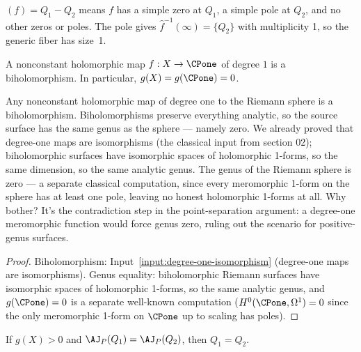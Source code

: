 \begin{proofsketch}
\((f)=Q_1-Q_2\) means \(f\) has a simple zero at \(Q_1\), a simple pole
at \(Q_2\), and no other zeros or poles. The pole gives \(\widehat
f^{-1}(\infty)=\{Q_2\}\) with multiplicity 1, so the generic fiber has
size~1.
\end{proofsketch}

\begin{theorem}
\label{thm:riemann-hurwitz-deg1}
A nonconstant holomorphic map \(f:X\to\CPone\) of degree \(1\) is a
biholomorphism. In particular, \(g(X)=g(\CPone)=0\).
\leanok
\end{theorem}

\begin{layman}
Any nonconstant holomorphic map of degree one to the Riemann sphere is
a biholomorphism. Biholomorphisms preserve everything analytic, so the
source surface has the same genus as the sphere — namely zero. We
already proved that degree-one maps are isomorphisms (the classical
input from section 02); biholomorphic surfaces have isomorphic spaces
of holomorphic 1-forms, so the same dimension, so the same analytic
genus. The genus of the Riemann sphere is zero — a separate classical
computation, since every meromorphic 1-form on the sphere has at
least one pole, leaving no honest holomorphic 1-forms at all. Why
bother? It's the contradiction step in the point-separation argument:
a degree-one meromorphic function would force genus zero, ruling out
the scenario for positive-genus surfaces.
\end{layman}

\begin{proof}
Biholomorphism: Input~\ref{input:degree-one-isomorphism} (degree-one
maps are isomorphisms). Genus equality: biholomorphic Riemann surfaces
have isomorphic spaces of holomorphic 1-forms, so the same analytic
genus, and \(g(\CPone)=0\) is a separate well-known computation
(\(H^{0}(\CPone,\Omega^{1})=0\) since the only meromorphic 1-form on
\(\CPone\) up to scaling has poles).
\end{proof}

\begin{theorem}
\label{thm:abel-point-separation}
If \(g(X)>0\) and \(\AJ_P(Q_1)=\AJ_P(Q_2)\), then \(Q_1=Q_2\).
\leanok
\end{theorem}

